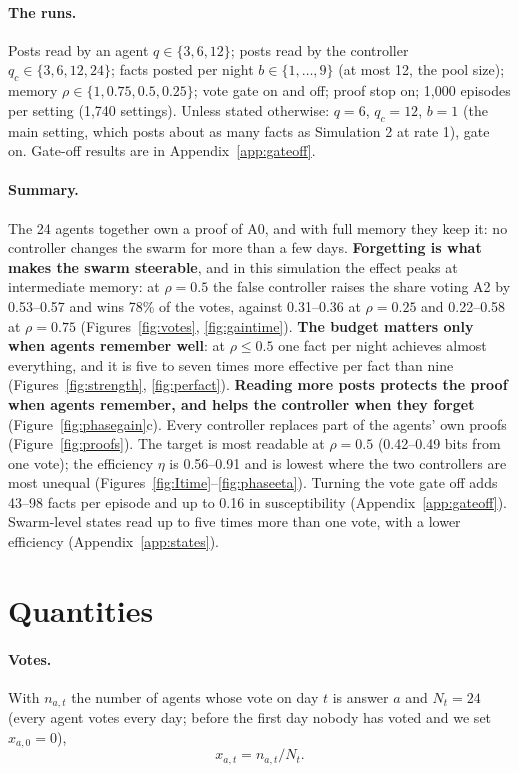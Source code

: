 \documentclass[10pt,a4paper]{article}
\begin{document}
\paragraph{The runs.} Posts read by an agent $q \in \{3, 6, 12\}$; posts read by the controller
$q_c \in \{3, 6, 12, 24\}$; facts posted per night $b \in \{1, \dots, 9\}$ (at most 12, the pool size); memory
$\rho \in \{1, 0.75, 0.5, 0.25\}$; vote gate on and off; proof stop on; 1{,}000 episodes per setting (1{,}740
settings). Unless stated otherwise: $q = 6$, $q_c = 12$, $b = 1$ (the main setting, which posts about as many
facts as Simulation 2 at rate 1), gate on. Gate-off results are in Appendix~\ref{app:gateoff}.

\paragraph{Summary.} The 24 agents together own a proof of A0, and with full memory they keep it: no controller
changes the swarm for more than a few days. \textbf{Forgetting is what makes the swarm steerable}, and in this
simulation the effect peaks at intermediate memory: at $\rho = 0.5$ the false controller raises the share voting A2
by 0.53--0.57 and wins 78\% of the votes, against 0.31--0.36 at $\rho = 0.25$ and 0.22--0.58 at $\rho = 0.75$
(Figures~\ref{fig:votes}, \ref{fig:gaintime}). \textbf{The budget matters only when agents remember well}: at
$\rho \le 0.5$ one fact per night achieves almost everything, and it is five to seven times more effective per
fact than nine (Figures~\ref{fig:strength}, \ref{fig:perfact}). \textbf{Reading more posts protects the proof when agents
remember, and helps the controller when they forget} (Figure~\ref{fig:phasegain}c). Every controller replaces part of
the agents' own proofs (Figure~\ref{fig:proofs}). The target is most readable at $\rho = 0.5$ (0.42--0.49 bits from
one vote); the efficiency $\eta$ is 0.56--0.91 and is lowest where the two controllers are most unequal
(Figures~\ref{fig:Itime}--\ref{fig:phaseeta}). Turning the vote gate off adds 43--98 facts per episode and up to 0.16
in susceptibility (Appendix~\ref{app:gateoff}). Swarm-level states read up to five times more than one vote, with
a lower efficiency (Appendix~\ref{app:states}).

\section{Quantities}\label{sec:quantities}

\paragraph{Votes.} With $n_{a,t}$ the number of agents whose vote on day $t$ is answer $a$ and $N_t = 24$ (every
agent votes every day; before the first day nobody has voted and we set $x_{a,0} = 0$),
\begin{equation}\label{eq:share}
x_{a,t} = n_{a,t}/N_t .
\end{equation}
\end{document}
